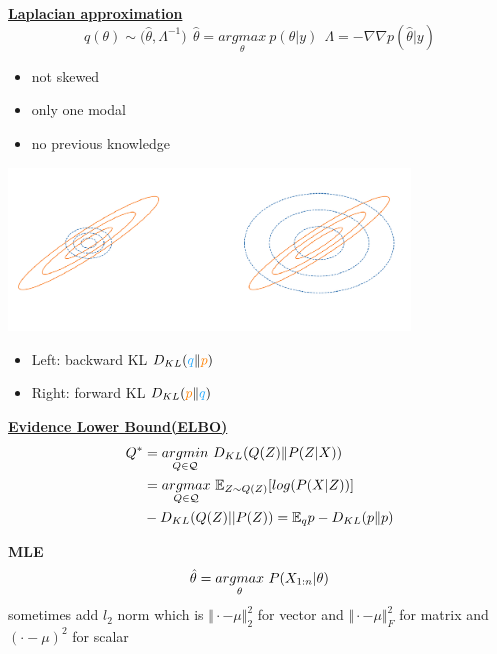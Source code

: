 \documentclass[landscape,a0paper,fontscale=0.285]{baposter} %
\newcommand{\compresslist}{ %
\setlength{\itemsep}{1pt}
\setlength{\parskip}{0pt}
\setlength{\parsep}{0pt}
}
\begin{document}
\begin{poster}
{\colorbox[HTML]{CCFFFF}{}
\underline{\textbf{Laplacian approximation}}
\vspace{-0.3cm}
$$
q(\theta)\sim \mathcal (\hat\theta, \Lambda^{-1})~~
\hat\theta = \underset{\theta}{argmax}~p(\theta|y)~~
\Lambda = -\nabla\nabla p(\hat\theta|y)
$$
\vspace{-1.0cm}
\begin{itemize}\compresslist
    \item not skewed
    \item only one modal 
    \item no previous knowledge
\end{itemize}
\vspace{-0.5cm}
\begin{center}
\includegraphics[width=0.8\textwidth, trim={0cm 3cm 0 2cm},clip]{figures/F5wAvc7PQ2CK3qB.png}
\end{center}
\vspace{-1cm}
\begin{itemize}\compresslist
    \item Left: backward KL $D_{KL}(\textcolor{lightblue}{q}\Vert \textcolor{orange}{p})$ 
    \item Right: forward KL $D_{KL}(\textcolor{orange}{p}\Vert \textcolor{lightblue}{q})$
\end{itemize}
\vspace{-0.3cm}
\underline{\textbf{Evidence Lower Bound(ELBO)}}
\vspace{-0.3cm}
$$\vspace{-0.2cm}
\begin{aligned}
Q^* &= \underset{Q\in\mathcal Q}{argmin}~D_{KL}(Q(Z)\Vert P(Z|X)) 
\\
&= \underset{Q\in\mathcal Q}{argmax}~\mathbb E_{Z\sim Q(Z)}[log(P(X|Z))] 
\\
&- D_{KL}(Q(Z)||P(Z)) = \mathbb E_q p - D_{KL}(p\Vert p)
\end{aligned}
$$

\textbf{MLE}
\vspace{-0.4cm}
$$\vspace{-0.2cm}
\hat \theta = \underset{\theta}{argmax}~P(X_{1:n}|\theta)
$$
sometimes add $l_2$ norm which is $\Vert \cdot - \mu \Vert_2^2$ for vector and $\Vert \cdot - \mu \Vert_F^2$ for matrix and $(\cdot-\mu)^2$ for scalar

}
\end{poster}
\end{document}
